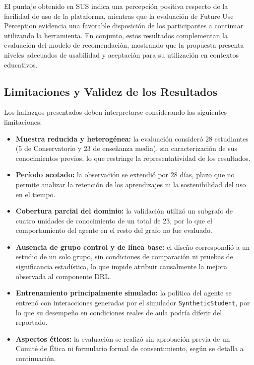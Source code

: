 El puntaje obtenido en SUS indica una percepción positiva respecto de la facilidad de uso de la plataforma, mientras que la evaluación de Future Use Perception evidencia una favorable disposición de los participantes a continuar utilizando la herramienta. En conjunto, estos resultados complementan la evaluación del modelo de recomendación, mostrando que la propuesta presenta niveles adecuados de usabilidad y aceptación para su utilización en contextos educativos.

\subsection{Limitaciones y Validez de los Resultados}

Los hallazgos presentados deben interpretarse considerando las siguientes limitaciones:

\begin{itemize}
\item \textbf{Muestra reducida y heterogénea:} la evaluación consideró 28 estudiantes (5 de Conservatorio y 23 de enseñanza media), sin caracterización de sus conocimientos previos, lo que restringe la representatividad de los resultados.
\item \textbf{Período acotado:} la observación se extendió por 28 días, plazo que no permite analizar la retención de los aprendizajes ni la sostenibilidad del uso en el tiempo.
\item \textbf{Cobertura parcial del dominio:} la validación utilizó un subgrafo de cuatro unidades de conocimiento de un total de 23, por lo que el comportamiento del agente en el resto del grafo no fue evaluado.
\item \textbf{Ausencia de grupo control y de línea base:} el diseño correspondió a un estudio de un solo grupo, sin condiciones de comparación ni pruebas de significancia estadística, lo que impide atribuir causalmente la mejora observada al componente DRL.
\item \textbf{Entrenamiento principalmente simulado:} la política del agente se entrenó con interacciones generadas por el simulador \texttt{SyntheticStudent}, por lo que su desempeño en condiciones reales de aula podría diferir del reportado.
\item \textbf{Aspectos éticos:} la evaluación se realizó sin aprobación previa de un Comité de Ética ni formulario formal de consentimiento, según se detalla a continuación.
\end{itemize}

